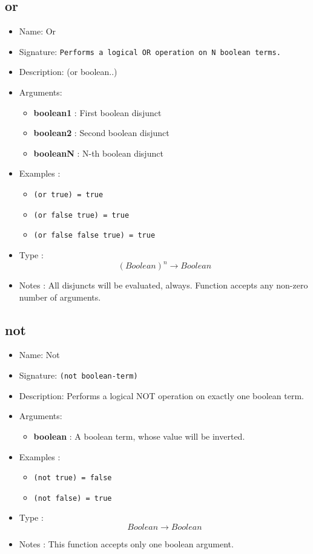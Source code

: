 \subsection{or}
\begin{itemize}
    \item Name: Or
    \item Signature: \texttt{Performs a logical OR operation on N boolean terms.}
    \item Description: (or boolean..)
    \item Arguments:
        \begin{itemize}
            \item \textbf{boolean1} : First boolean disjunct
            \item \textbf{boolean2} : Second boolean disjunct
            \item \textbf{booleanN} : N-th boolean disjunct
        \end{itemize}
    \item Examples :
        \begin{itemize}
            \item \texttt{(or true) = true}
            \item \texttt{(or false true) = true}
            \item \texttt{(or false false true) = true}
        \end{itemize}
    \item Type : \[(Boolean)^n \to Boolean\]
    \item Notes : All disjuncts will be evaluated, always. Function accepts any non-zero number of arguments.
\end{itemize}

\subsection{not}
\begin{itemize}
    \item Name: Not
    \item Signature: \texttt{(not boolean-term)}
    \item Description: Performs a logical NOT operation on exactly one boolean term.
    \item Arguments:
        \begin{itemize}
            \item \textbf{boolean} : A boolean term, whose value will be inverted.
        \end{itemize}
    \item Examples :
        \begin{itemize}
            \item \texttt{(not true) = false}
            \item \texttt{(not false) = true}
        \end{itemize}
    \item Type : \[Boolean \to Boolean\]
    \item Notes : This function accepts only one boolean argument.
\end{itemize}

